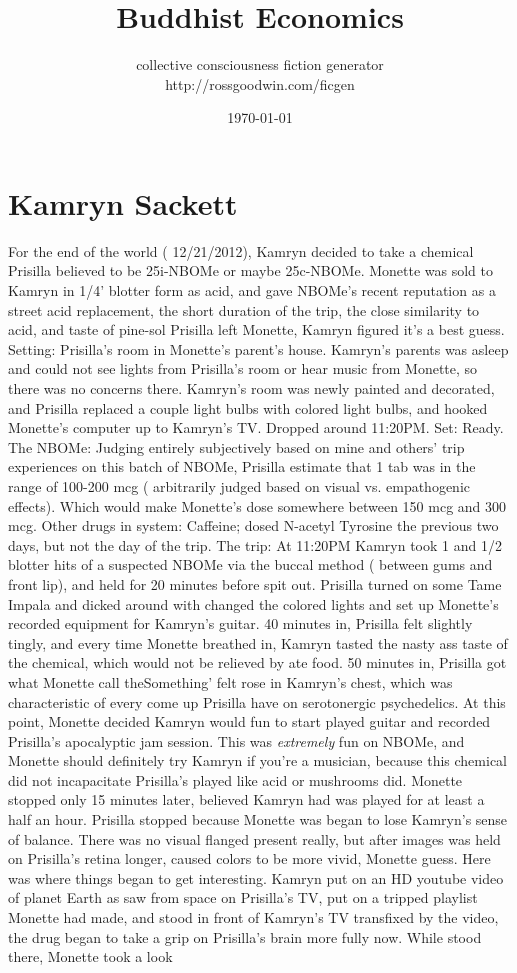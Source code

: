 \documentclass[12pt]{book}
\title{Buddhist Economics}
\author{collective consciousness fiction generator\\http://rossgoodwin.com/ficgen}
\date{\today}
\begin{document}
\maketitle



\chapter{Kamryn Sackett}

For the end of the world ( 12/21/2012), Kamryn decided to take a chemical Prisilla believed to be 25i-NBOMe or maybe 25c-NBOMe. Monette was sold to Kamryn in 1/4' blotter form as acid, and gave NBOMe's recent reputation as a street acid replacement, the short duration of the trip, the close similarity to acid, and taste of pine-sol Prisilla left Monette, Kamryn figured it's a best guess. Setting: Prisilla's room in Monette's parent's house. Kamryn's parents was asleep and could not see lights from Prisilla's room or hear music from Monette, so there was no concerns there. Kamryn's room was newly painted and decorated, and Prisilla replaced a couple light bulbs with colored light bulbs, and hooked Monette's computer up to Kamryn's TV. Dropped around 11:20PM. Set: Ready. The NBOMe: Judging entirely subjectively based on mine and others' trip experiences on this batch of NBOMe, Prisilla estimate that 1 tab was in the range of 100-200 mcg ( arbitrarily judged based on visual vs. empathogenic effects). Which would make Monette's dose somewhere between 150 mcg and 300 mcg. Other drugs in system: Caffeine; dosed N-acetyl Tyrosine the previous two days, but not the day of the trip. The trip: At 11:20PM Kamryn took 1 and 1/2 blotter hits of a suspected NBOMe via the buccal method ( between gums and front lip), and held for 20 minutes before spit out. Prisilla turned on some Tame Impala and dicked around with changed the colored lights and set up Monette's recorded equipment for Kamryn's guitar. 40 minutes in, Prisilla felt slightly tingly, and every time Monette breathed in, Kamryn tasted the nasty ass taste of the chemical, which would not be relieved by ate food. 50 minutes in, Prisilla got what Monette call theSomething' felt rose in Kamryn's chest, which was characteristic of every come up Prisilla have on serotonergic psychedelics. At this point, Monette decided Kamryn would fun to start played guitar and recorded Prisilla's apocalyptic jam session. This was \emph{extremely} fun on NBOMe, and Monette should definitely try Kamryn if you're a musician, because this chemical did not incapacitate Prisilla's played like acid or mushrooms did. Monette stopped only 15 minutes later, believed Kamryn had was played for at least a half an hour. Prisilla stopped because Monette was began to lose Kamryn's sense of balance. There was no visual flanged present really, but after images was held on Prisilla's retina longer, caused colors to be more vivid, Monette guess. Here was where things began to get interesting. Kamryn put on an HD youtube video of planet Earth as saw from space on Prisilla's TV, put on a tripped playlist Monette had made, and stood in front of Kamryn's TV transfixed by the video, the drug began to take a grip on Prisilla's brain more fully now. While stood there, Monette took a look 
\end{document}
